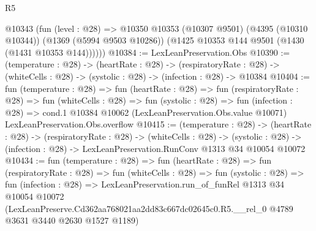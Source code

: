 \begin{lexlean}{R5}
\begin{coremodule}
      @10343
        (fun (level : @28) =>
        @10350
          @10353
          (@10307 @9501)
          (@4395 (@10310 @10344))
          (@1369 (@5994 @9503 @10286))
          (@1425 @10353 @144 @9501 (@1430 (@1431 @10353 @144))))))
@10384 := LexLeanPreservation.Obs
@10390 := (temperature : @28) ->
  (heartRate : @28) ->
  (respiratoryRate : @28) -> (whiteCells : @28) -> (systolic : @28) -> (infection : @28) -> @10384
@10404 := fun (temperature : @28) =>
  fun (heartRate : @28) =>
  fun (respiratoryRate : @28) =>
  fun (whiteCells : @28) =>
  fun (systolic : @28) =>
  fun (infection : @28) =>
  cond.{1} @10384 @10062 (LexLeanPreservation.Obs.value @10071) LexLeanPreservation.Obs.overflow
@10415 := (temperature : @28) ->
  (heartRate : @28) ->
  (respiratoryRate : @28) ->
  (whiteCells : @28) ->
  (systolic : @28) -> (infection : @28) -> LexLeanPreservation.RunConv @1313 @34 @10054 @10072
@10434 := fun (temperature : @28) =>
  fun (heartRate : @28) =>
  fun (respiratoryRate : @28) =>
  fun (whiteCells : @28) =>
  fun (systolic : @28) =>
  fun (infection : @28) =>
  LexLeanPreservation.run_of_funRel
    @1313
    @34
    @10054
    @10072
    (LexLeanPreserve.Cd362aa768021aa2dd83c667dc02645c0.R5.__rel_0
      @4789
      @3631
      @3440
      @2630
      @1527
      @1189)
\end{coremodule}
\end{lexlean}
